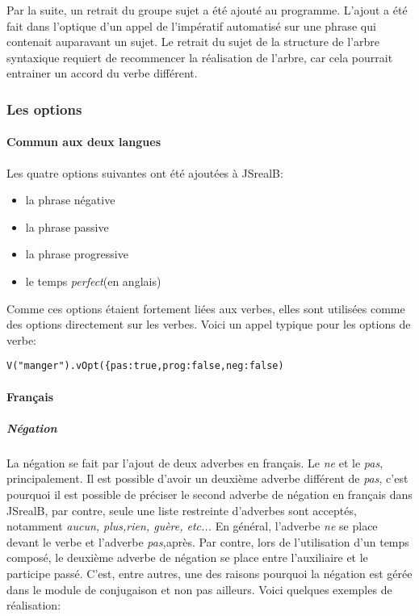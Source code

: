 \documentclass[11pt]{article} %
\begin{document}
Par la suite, un retrait du groupe sujet a été ajouté au programme.
L'ajout a été fait dans l'optique d'un appel de l'impératif automatisé
sur une phrase qui contenait auparavant un sujet. Le retrait du sujet
de la structure de l'arbre syntaxique requiert de recommencer la réalisation
de l'arbre, car cela pourrait entrainer un accord du verbe différent.

\subsubsection{Les options}
\label{vOptions}
\paragraph{Commun aux deux langues}
Les quatre options suivantes ont été ajoutées à JSrealB:
\begin{itemize}
\item la phrase négative
\item la phrase passive
\item la phrase progressive
\item le temps \emph{perfect}(en anglais)
\end{itemize} 
Comme ces options étaient fortement liées aux verbes, elles sont utilisées
comme des options directement sur les verbes. Voici un appel typique pour les options de verbe: 
\begin{alltt}
{V("manger").vOpt(\{pas:true,prog:false,neg:false)}
\end{alltt}

\paragraph{Français}

\subparagraph{Négation}

La négation se fait par l'ajout de deux adverbes en français. Le \emph{ne}
et le \emph{pas}, principalement. Il est possible d'avoir un
deuxième adverbe différent de \emph{pas}, c'est pourquoi il est possible
de préciser le second adverbe de négation en français dans JSrealB,
par contre, seule une liste restreinte d'adverbes sont acceptés, notamment
\emph{aucun, plus,rien, guère, etc... }En général, l'adverbe
\emph{ne }se place devant le verbe et l'adverbe \emph{pas,}après.
Par contre, lors de l'utilisation d'un temps composé, le deuxième
adverbe de négation se place entre l'auxiliaire et le participe passé.
C'est, entre autres, une des raisons pourquoi la négation est gérée
dans le module de conjugaison et non pas ailleurs. Voici quelques
exemples de réalisation:
\end{document}
